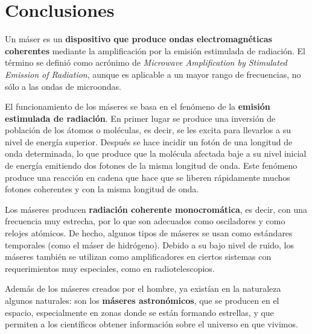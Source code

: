\section{Conclusiones}
\label{conclusiones}

Un m\'aser es un \textbf{dispositivo que produce ondas electromagn\'eticas coherentes} mediante la amplificaci\'on por la emisi\'on estimulada de radiaci\'on. El t\'ermino se defini\'o como acr\'onimo de \textit{Microwave Amplification by Stimulated Emission of Radiation}, aunque es aplicable a un mayor rango de frecuencias, no s\'olo a las ondas de microondas.

El funcionamiento de los m\'aseres se basa en el fen\'omeno de la \textbf{emisi\'on estimulada de radiaci\'on}. En primer lugar se produce una inversi\'on de poblaci\'on de los \'atomos o mol\'eculas, es decir, se les excita para llevarlos a su nivel de energ\'ia superior. Despu\'es se hace incidir un fot\'on de una longitud de onda determinada, lo que produce que la mol\'ecula afectada baje a su nivel inicial de energ\'ia emitiendo dos fotones de la misma longitud de onda. Este fen\'omeno produce una reacci\'on en cadena que hace que se liberen r\'apidamente muchos fotones coherentes y con la misma longitud de onda.

Los m\'aseres producen \textbf{radiaci\'on coherente monocrom\'atica}, es decir, con una frecuencia muy estrecha, por lo que son adecuados como osciladores y como relojes at\'omicos. De hecho, algunos tipos de m\'aseres se usan como est\'andares temporales (como el m\'aser de hidr\'ogeno). Debido a su bajo nivel de ruido, los m\'aseres tambi\'en se utilizan como amplificadores en ciertos sistemas con requerimientos muy especiales, como en radiotelescopios.

Adem\'as de los m\'aseres creados por el hombre, ya exist\'ian en la naturaleza algunos naturales: son los \textbf{m\'aseres astron\'omicos}, que se producen en el espacio, especialmente en zonas donde se est\'an formando estrellas, y que permiten a los cient\'ificos obtener informaci\'on sobre el universo en que vivimos.

